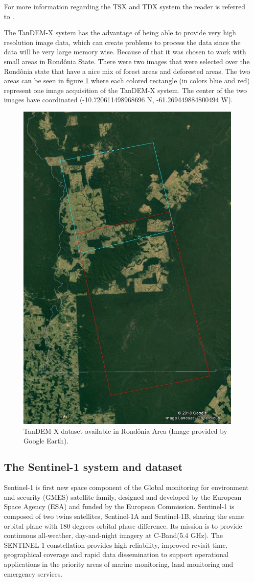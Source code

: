 For more information regarding the TSX and TDX system the reader is referred to \cite{Alberto}.

The TanDEM-X system has the advantage of being able to provide very high resolution image data, which can create problems to process the data since the data will be very large memory wise. Because of that it was chosen to work with small areas in Rondônia State. There were two images that were selected over the Rondônia state that have a nice mix of forest areas and deforested areas. The two areas can be seen in figure \ref{fig:tandem_dataset} where each colored rectangle (in colors blue and red) represent one image acquisition of the TanDEM-X system. The center of the two images have coordinated (-10.720611498968696 N, -61.269449884800494 W).

\begin{figure}[h]
    \centering
    \includegraphics[width=0.6\linewidth]{Cap2-Methods/tandem_dataset.jpg}
    \caption{TanDEM-X dataset available in Rondônia Area (Image provided by Google Earth).}
    \label{fig:tandem_dataset}
\end{figure}{}

\subsection{The Sentinel-1 system and dataset}

Sentinel-1 is first new space component of the Global monitoring for environment and security (GMES) satellite family, designed and developed by the European Space Agency (ESA) and funded by the European Commission. Sentinel-1 is composed of two twins satellites, Sentinel-1A and Sentinel-1B, sharing the same orbital plane with 180 degrees orbital phase difference. Its mission is to provide continuous all-weather, day-and-night imagery at C-Band(5.4 GHz). The SENTINEL-1 constellation provides high reliability, improved revisit time, geographical coverage and rapid data dissemination to support operational applications in the priority areas of marine monitoring, land monitoring and emergency services.

